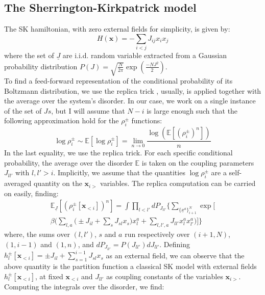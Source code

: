 \documentclass[aps,physrev,10pt,floatfix,reprint]{revtex4-2}
\begin{document}
\subsection{The Sherrington-Kirkpatrick model}
The SK hamiltonian, with zero external fields for simplicity, is given by:
\begin{equation}
H\left(\mathbf{x}\right)=-\sum_{i<j}J_{ij}x_{i}x_{j}
\end{equation}
where the set of $\underline{J}$ are i.i.d. random variable extracted from a Gaussian probability distribution $P(J)=\sqrt{\frac{N}{2\pi}}\exp\left(\frac{-NJ^2}{2} \right)$. \\
To find a feed-forward representation of the conditional probability of its Boltzmann distribution, we use the replica trick \cite{10.1142/0271}, usually, is applied together with the average over the system's disorder. In our case, we work on a single instance of the set of $Js$, but I will assume that $N-i$ is large enough such that the following approximation hold for the $\rho_i^{\pm}$ functions: 
\[
\log\rho_i^{\pm} \sim \mathbb{E}\left[  \log\rho_i^{\pm} \right] = \lim_{n\rightarrow 0} \frac{  \log(\mathbb{E}\left[(\rho_i^{\pm})^n \right])}{n}
\]
In the last equality, we use the replica trick. 
For each specific conditional probability, the average over the disorder $\mathbb{E}$ is taken on the coupling parameters $J_{ll'}$ with $l,l'>i$. Implicitly, we assume that the quantities $\log\rho_i^{\pm}$ are a self-averaged quantity on the $\mathbf{x}_{i>}$ variables.
 The replica computation can be carried on easily, finding:
\begin{multline}
\mathbb{E}_{\underline{J}}\left[(\rho_i^{\pm}[\mathbf{x}_{<i}])^n \right]  = 
\int \prod_{l<l'} dP_{J_{ll'}} \bigg\{ 
\sum_{\{\underline{x}^{a}\}_{i+1}^N} \exp\bigg[\\ \beta \bigg( 
\sum_{l,a}\bigg( \pm J_{il}  
+ \sum_{s} J_{sl} x_s \bigg) x_l^{a} + 
\sum_{l,l', a} J_{ll'} x_l^{a} x_{l'}^{a}
\bigg)  \bigg] 
\bigg\}
\end{multline}
where, the sums over $(l,l')$, $s$ and $a$ run respectively over $(i+1,N)$, $(1,i-1)$ and $(1,n)$, and $dP_{J_{ll'}}=P(J_{ll'})dJ_{ll'}$. Defining $h_l^{\pm}[\mathbf{x}_{<i}] =\pm J_{il} + \sum_{s=1}^{i-1} J_{sl} x_s$ as an external field, we can observe that the above quantity is the partition function a classical SK model with external fields $h_l^{\pm}[\mathbf{x}_{<i}]$, at fixed $\mathbf{x}_{<i}$ and $J_{ll'}$ as coupling constants of the variables $\mathbf{x}_{i>}$.  
Computing the integrals over the disorder, we find: 
\end{document}

